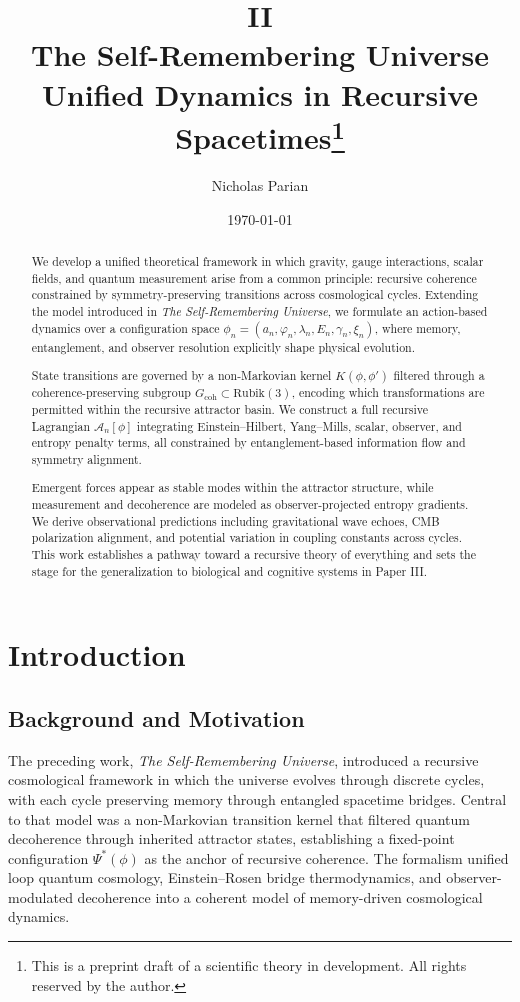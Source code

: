 \documentclass[11pt]{article}
\title{\textbf{II\\The Self-Remembering Universe\\Unified Dynamics in Recursive Spacetimes\footnote{This is a preprint draft of a scientific theory in development. All rights reserved by the author.}}}
\author[1]{Nicholas Parian}
\date{\today}
\begin{document}
\maketitle

\begin{abstract}
We develop a unified theoretical framework in which gravity, gauge interactions, scalar fields, and quantum measurement arise from a common principle: recursive coherence constrained by symmetry-preserving transitions across cosmological cycles. Extending the model introduced in \textit{The Self-Remembering Universe}, we formulate an action-based dynamics over a configuration space $\phi_n = (a_n, \varphi_n, \lambda_n, E_n, \gamma_n, \xi_n)$, where memory, entanglement, and observer resolution explicitly shape physical evolution. 

State transitions are governed by a non-Markovian kernel $K(\phi, \phi')$ filtered through a coherence-preserving subgroup $G_{\text{coh}} \subset \text{Rubik}(3)$, encoding which transformations are permitted within the recursive attractor basin. We construct a full recursive Lagrangian $\mathcal{A}_n[\phi]$ integrating Einstein–Hilbert, Yang–Mills, scalar, observer, and entropy penalty terms, all constrained by entanglement-based information flow and symmetry alignment.

Emergent forces appear as stable modes within the attractor structure, while measurement and decoherence are modeled as observer-projected entropy gradients. We derive observational predictions including gravitational wave echoes, CMB polarization alignment, and potential variation in coupling constants across cycles. This work establishes a pathway toward a recursive theory of everything and sets the stage for the generalization to biological and cognitive systems in Paper III.
\end{abstract}


\tableofcontents

\section{Introduction}

\subsection{Background and Motivation}

The preceding work, \textit{The Self-Remembering Universe}, introduced a recursive cosmological framework in which the universe evolves through discrete cycles, with each cycle preserving memory through entangled spacetime bridges. Central to that model was a non-Markovian transition kernel that filtered quantum decoherence through inherited attractor states, establishing a fixed-point configuration $\Psi^*(\phi)$ as the anchor of recursive coherence. The formalism unified loop quantum cosmology, Einstein–Rosen bridge thermodynamics, and observer-modulated decoherence into a coherent model of memory-driven cosmological dynamics.
\end{document}
